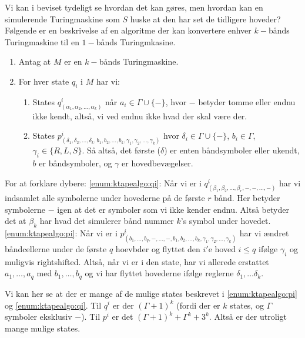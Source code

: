 Vi kan i beviset tydeligt se hvordan det kan gøres, men hvordan kan en simulerende Turingmaskine som $S$ huske at den har set de tidligere hoveder? Følgende er en beskrivelse af en algoritme der kan konvertere enhver $k-$bånds Turingmaskine til en $1-$bånds Turingmkasine.

\begin{enumerate}
  \item Antag at $M$ er en $k-$bånds Turingmaskine.
  \item For hver state $q_{i}$ i $M$ har vi:
		\begin{enumerate}
		  \item\label{enum:ktapealgo:qi} States $q^{i}_{(\alpha_{1}, \alpha_{2}, \ldots, \alpha_{k})}$ når $a_{i} \in \Gamma \cup \{-\}$, hvor $-$ betyder tomme eller endnu ikke kendt, altså, vi ved endnu ikke hvad der skal være der.
		  \item\label{enum:ktapealgo:pi} States $p^{i}_{(\delta_{1}, \delta_{2}, \ldots, \delta_{k}, b_{1}, b_{2}, \ldots, b_{k}, \gamma_{1}, \gamma_{2}, \ldots, \gamma_{k})}$ hvor $\delta_{i} \in \Gamma \cup \{-\}$, $b_{i} \in \Gamma$, $\gamma_{i} \in \{R, L, S\}$. Så altså, det første (\(\delta\)) er enten båndsymboler eller ukendt, $b$  er båndsymboler,  og $\gamma$ er hovedbevægelser.
		\end{enumerate}
\end{enumerate}

For at forklare dybere: \ref{enum:ktapealgo:qi}: Når vi er i $q^{i}_{(\beta_{1}, \beta_{2}, \ldots, \beta_{r},-,-,\ldots,-)}$ har vi indsamlet alle symbolerne under hovederne på de første $r$ bånd. Her betyder symbolerne $-$ igen at det er symboler som vi ikke kender endnu. Altså betyder det at \(\beta_{k}\) har hvad det simulerer bånd nummer $k$'s symbol under hovedet.
\ref{enum:ktapealgo:pi}: Når vi er i $p^{i}_{(b_{1}, \ldots, b_{q}, -, \ldots, -, b_{1}, b_{2}, \ldots, b_k, \gamma_{1}, \gamma_{2}, \ldots, \gamma_{k})}$ har vi ændret båndcellerne under de første $q$ hoevbder og flyttet den $i'$e hoved $i \le q$ ifølge $\gamma_{i}$ og muligvis rightshifted. Altså, når vi er i den state, har vi allerede erstattet $a_{1}, \ldots, a_{q}$ med $b_{1}, \ldots, b_{q}$ og vi har flyttet hovederne ifølge reglerne $\delta_{1}, \ldots \delta_{k}$.

Vi kan her se at der  er mange af de mulige states beskrevet i \ref{enum:ktapealgo:pi} og \ref{enum:ktapealgo:qi}. Til $q^{i}$ er der $(\Gamma+1)^{k}$ (fordi der er $k$ states, og $\Gamma$ symboler eksklusiv $-$). Til $p^{i}$ er det $(\Gamma+1)^{k} + \Gamma^{k} + 3^{k}$. Altså er der utroligt mange mulige states.

